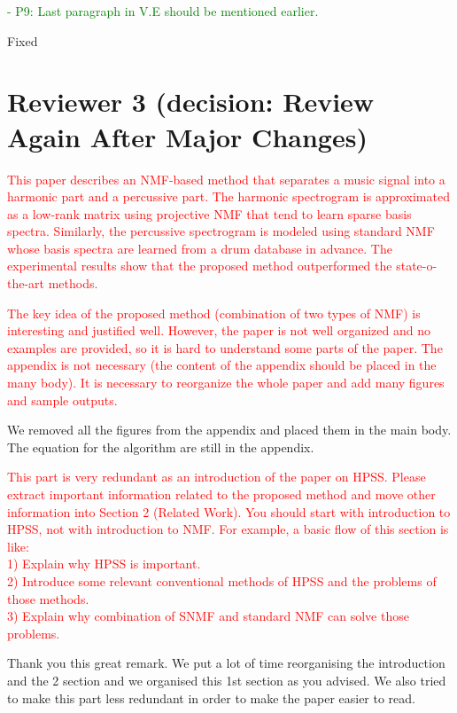 \documentclass[]{article}
\begin{document}
\textcolor{green}{- P9: Last paragraph in V.E should be mentioned earlier.}


Fixed




\section{Reviewer 3 (decision: Review Again After Major Changes)}
\label{sec:rev3}

\textcolor{red}{This paper describes an NMF-based method that separates a music signal into a harmonic part and a percussive part. The harmonic spectrogram is approximated as a low-rank matrix using projective NMF that tend to learn sparse basis spectra. Similarly, the percussive spectrogram is modeled using standard NMF whose basis spectra are learned from a drum database in advance. The experimental results show that the proposed method outperformed the state-o-the-art methods.
}



\textcolor{red}{The key idea of the proposed method (combination of two types of NMF) is interesting and justified well. However, the paper is not well organized and no examples are provided, so it is hard to understand some parts of the paper. The appendix is not necessary (the content of the appendix should be placed in the many body). It is necessary to reorganize the whole paper and add many figures and sample outputs.
}

We removed all the figures from the appendix and placed them in the main body. The equation for the algorithm are still in the appendix.



\textcolor{red}{This part is very redundant as an introduction of the paper on HPSS. Please extract important information related to the proposed method and move other information into Section 2 (Related Work). You should start with introduction to HPSS, not with introduction to NMF. For example, a basic flow of this section is like:\\
1) Explain why HPSS is important.\\
2) Introduce some relevant conventional methods of HPSS and the problems of those methods.\\
3) Explain why combination of SNMF and standard NMF can solve those problems.
}

Thank you this great remark. We put a lot of time reorganising the introduction and the 2 section and we organised this 1st section as you advised. We also tried to make this part less redundant in order to make the paper easier to read. 
\end{document}

